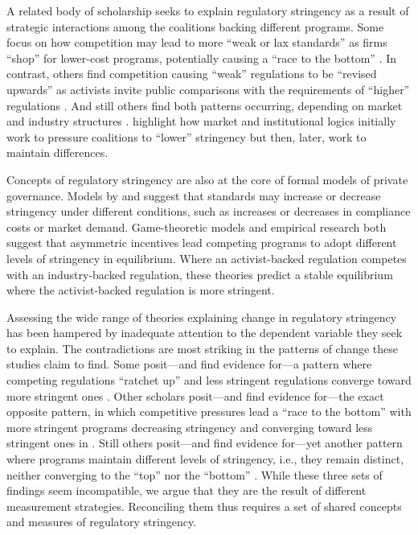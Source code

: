 \documentclass[
      12pt,
            Review ]{article}
\begin{document}
A related body of scholarship seeks to explain regulatory stringency as
a result of strategic interactions among the coalitions backing
different programs. Some focus on how competition may lead to more
``weak or lax standards'' as firms ``shop'' for lower-cost programs,
potentially causing a ``race to the bottom''
\citep{Abbott2010, Fransen2011, Gulbrandsen2004}. In contrast, others
find competition causing ``weak'' regulations to be ``revised upwards''
as activists invite public comparisons with the requirements of
``higher'' regulations \citep{Overdevest2005, Overdevest2010}. And still
others find both patterns occurring, depending on market and industry
structures \citep{Cashore2004, Hassel2008, VanderVen2015}.
\citet{Cashore2004} highlight how market and institutional logics
initially work to pressure coalitions to ``lower'' stringency but then,
later, work to maintain differences.

Concepts of regulatory stringency are also at the core of formal models
of private governance. Models by \citet{Abderrazak2009} and
\citet{Fischer2014} suggest that standards may increase or decrease
stringency under different conditions, such as increases or decreases in
compliance costs or market demand. Game-theoretic models
\citep{Fischer2014, Li2015, Poret2016} and empirical research
\citep{Cashore2004} both suggest that asymmetric incentives lead
competing programs to adopt different levels of stringency in
equilibrium. Where an activist-backed regulation competes with an
industry-backed regulation, these theories predict a stable equilibrium
where the activist-backed regulation is more stringent.

Assessing the wide range of theories explaining change in regulatory
stringency has been hampered by inadequate attention to the dependent
variable they seek to explain. The contradictions are most striking in
the patterns of change these studies claim to find. Some posit---and
find evidence for---a pattern where competing regulations ``ratchet up''
and less stringent regulations converge toward more stringent ones
\citep{Overdevest2005, Overdevest2010, Overdevest2014}. Other scholars
posit---and find evidence for---the exact opposite pattern, in which
competitive pressures lead a ``race to the bottom'' with more stringent
programs decreasing stringency and converging toward less stringent ones
in \citep{Abbott2010, Fransen2011, Gulbrandsen2004}. Still others
posit---and find evidence for---yet another pattern where programs
maintain different levels of stringency, i.e., they remain distinct,
neither converging to the ``top'' nor the ``bottom''
\citep{Fischer2014, Li2015, Poret2016, Cashore2004}. While these three
sets of findings seem incompatible, we argue that they are the result of
different measurement strategies. Reconciling them thus requires a set
of shared concepts and measures of regulatory stringency.
\end{document}
